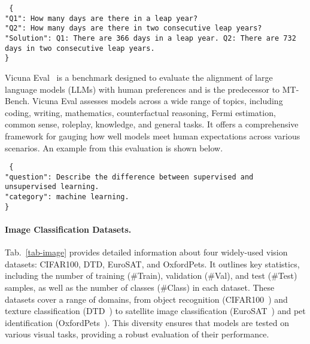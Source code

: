 \begin{tcolorbox}[colback=green!5!white, colframe=black!75!, sharp corners, boxrule=1pt]
\footnotesize
\texttt{
\{\\
\hspace*{0.5cm} "Q1": How many days are there in a leap year?\\
\hspace*{0.5cm} "Q2": How many days are there in two consecutive leap years?\\
\hspace*{0.5cm} "Solution": Q1: There are 366 days in a leap year. Q2: There are 732 days in two consecutive leap years.\\
\}
}
\end{tcolorbox}

Vicuna Eval~\cite{chiang2023vicuna} is a benchmark designed to evaluate the alignment of large language models (LLMs) with human preferences and is the predecessor to MT-Bench. Vicuna Eval assesses models across a wide range of topics, including coding, writing, mathematics, counterfactual reasoning, Fermi estimation, common sense, roleplay, knowledge, and general tasks. It offers a comprehensive framework for gauging how well models meet human expectations across various scenarios. An example from this evaluation is shown below.


\begin{tcolorbox}[colback=green!5!white, colframe=black!75!, sharp corners, boxrule=1pt]
\small
\texttt{
\{\\
\hspace*{0.5cm} "question": Describe the difference between supervised and unsupervised learning.\\
\hspace*{0.5cm} "category": machine learning.\\
\}
}
\end{tcolorbox}

\paragraph{Image Classification Datasets.}
Tab.~\ref{tab-image} provides detailed information about four widely-used vision datasets: CIFAR100, DTD, EuroSAT, and OxfordPets. It outlines key statistics, including the number of training (\#Train), validation (\#Val), and test (\#Test) samples, as well as the number of classes (\#Class) in each dataset. These datasets cover a range of domains, from object recognition (CIFAR100~\cite{krizhevsky2009learning}) and texture classification (DTD~\cite{cimpoi2014describing}) to satellite image classification (EuroSAT~\cite{helber2019eurosat}) and pet identification (OxfordPets~\cite{parkhi2012cats}). This diversity ensures that models are tested on various visual tasks, providing a robust evaluation of their performance.

